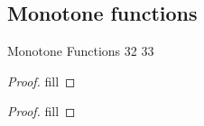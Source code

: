 \subsection{Monotone functions}

Monotone Functions
32
33

\begin{exercise}{32}
\end{exercise}
\begin{proof}
fill
\end{proof} 

\begin{exercise}{33}
\end{exercise}
\begin{proof}
fill
\end{proof} 